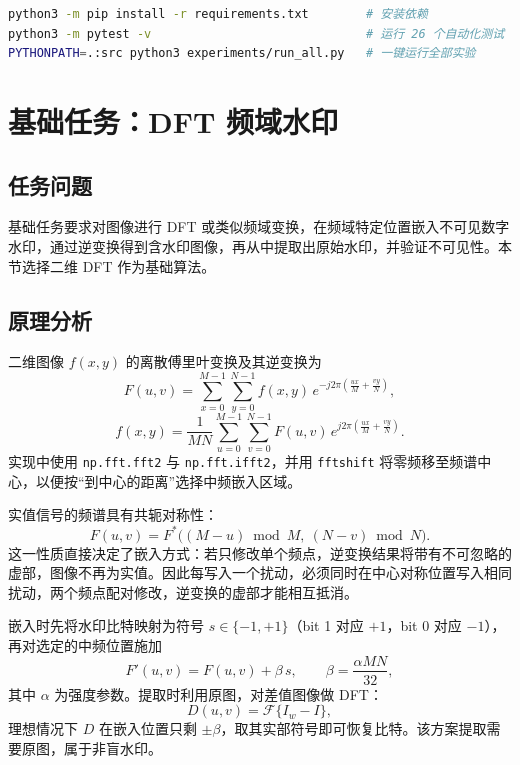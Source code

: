 \documentclass[11pt]{ctexart}
\begin{document}
\begin{lstlisting}[language=bash]
python3 -m pip install -r requirements.txt        # 安装依赖
python3 -m pytest -v                              # 运行 26 个自动化测试
PYTHONPATH=.:src python3 experiments/run_all.py   # 一键运行全部实验
\end{lstlisting}

\section{基础任务：DFT 频域水印}

\subsection{任务问题}

基础任务要求对图像进行 DFT 或类似频域变换，在频域特定位置嵌入不可见数字水印，通过逆变换得到含水印图像，再从中提取出原始水印，并验证不可见性。本节选择二维 DFT 作为基础算法。

\subsection{原理分析}

二维图像 $f(x,y)$ 的离散傅里叶变换及其逆变换为
\begin{equation}
  F(u,v) = \sum_{x=0}^{M-1}\sum_{y=0}^{N-1} f(x,y)\, e^{-j2\pi\left(\frac{ux}{M}+\frac{vy}{N}\right)},
  \label{eq:dft}
\end{equation}
\begin{equation}
  f(x,y) = \frac{1}{MN}\sum_{u=0}^{M-1}\sum_{v=0}^{N-1} F(u,v)\, e^{j2\pi\left(\frac{ux}{M}+\frac{vy}{N}\right)}.
  \label{eq:idft}
\end{equation}
实现中使用 \texttt{np.fft.fft2} 与 \texttt{np.fft.ifft2}，并用 \texttt{fftshift} 将零频移至频谱中心，以便按“到中心的距离”选择中频嵌入区域。

实值信号的频谱具有共轭对称性：
\begin{equation}
  F(u,v) = F^*\bigl((M-u)\bmod M,\ (N-v)\bmod N\bigr).
  \label{eq:conj}
\end{equation}
这一性质直接决定了嵌入方式：若只修改单个频点，逆变换结果将带有不可忽略的虚部，图像不再为实值。因此每写入一个扰动，必须同时在中心对称位置写入相同扰动，两个频点配对修改，逆变换的虚部才能相互抵消。

嵌入时先将水印比特映射为符号 $s\in\{-1,+1\}$（bit 1 对应 $+1$，bit 0 对应 $-1$），再对选定的中频位置施加
\begin{equation}
  F'(u,v) = F(u,v) + \beta\, s, \qquad \beta = \frac{\alpha M N}{32},
  \label{eq:embed}
\end{equation}
其中 $\alpha$ 为强度参数。提取时利用原图，对差值图像做 DFT：
\begin{equation}
  D(u,v) = \mathcal{F}\{I_w - I\},
  \label{eq:extract}
\end{equation}
理想情况下 $D$ 在嵌入位置只剩 $\pm\beta$，取其实部符号即可恢复比特。该方案提取需要原图，属于非盲水印。
\end{document}
